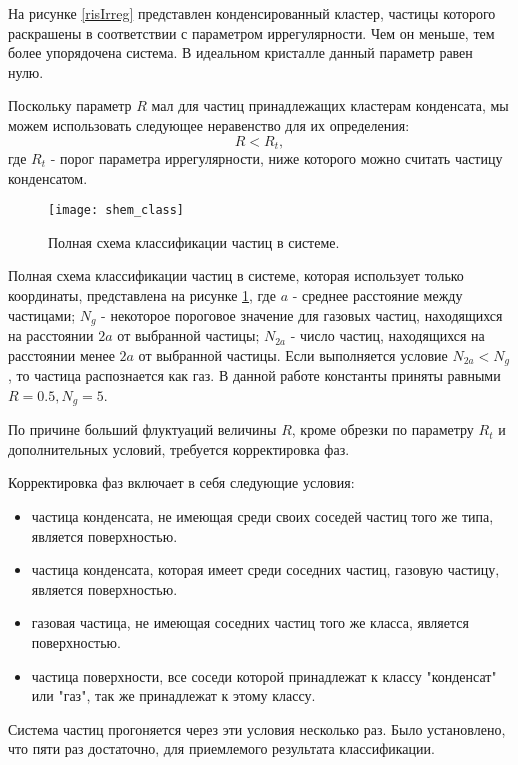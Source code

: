 На рисунке \ref{risIrreg} представлен конденсированный кластер, частицы которого раскрашены в соответствии с параметром иррегулярности. Чем он меньше, тем более упорядочена система. В идеальном кристалле данный параметр равен нулю.

Поскольку параметр $R$ мал для частиц принадлежащих кластерам конденсата, мы можем использовать следующее неравенство для их определения:
\begin{equation}
R < R_t,
\end{equation}
где $R_t$ - порог параметра иррегулярности, ниже которого можно считать частицу конденсатом.

\begin{figure}[h]
\begin{center}
\texttt{[image: shem\_class]}
\caption{Полная схема классификации частиц в системе.}
\label{risShemClass}
\end{center}
\end{figure}

Полная схема классификации частиц в системе, которая использует только координаты, представлена на рисунке \ref{risShemClass},
где $a$ - среднее расстояние между частицами; $N_g$ - некоторое пороговое значение для газовых частиц, находящихся на расстоянии $2a$ от выбранной частицы; $N_{2a}$ - число частиц, находящихся на расстоянии менее $2a$ от выбранной частицы. Если выполняется условие $N_{2a} < N_{g}$, то частица распознается как газ.
В данной работе константы приняты равными $R = 0.5, N_g = 5$.

По причине больший флуктуаций величины $R$, кроме обрезки по параметру $R_t$ и дополнительных условий, требуется корректировка фаз.

Корректировка фаз включает в себя следующие условия:
\begin{itemize}
\item частица конденсата, не имеющая среди своих соседей частиц того же типа, является поверхностью.
\item частица конденсата, которая имеет среди соседних частиц, газовую частицу, является поверхностью.
\item газовая частица, не имеющая соседних частиц того же класса,  является поверхностью.
\item частица поверхности, все соседи которой принадлежат к классу "конденсат" или "газ", так же принадлежат к этому классу.
\end{itemize}
Система частиц прогоняется через эти условия несколько раз. Было установлено, что пяти раз достаточно, для приемлемого результата классификации.

